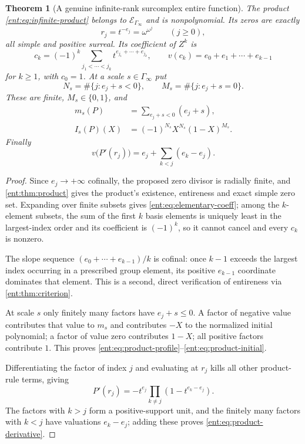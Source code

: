 \documentclass[11pt]{article}
\newtheorem{theorem}{Theorem}[section]
\theoremstyle{plain}
\theoremstyle{plain}
\theoremstyle{plain}
\theoremstyle{definition}
\theoremstyle{definition}
\theoremstyle{definition}
\theoremstyle{definition}
\theoremstyle{remark}
\begin{document}
\begin{theorem}[A genuine infinite-rank surcomplex entire function]
\label{ent:thm:infinite-example}
The product \eqref{ent:eq:infinite-product} belongs to
$\mathcal E_{\Gamma_\infty}$ and is nonpolynomial. Its zeros are exactly
\begin{equation}\label{ent:eq:surreal-zeros}
 r_j=t^{-e_j}=\omega^{\omega^j}\qquad(j\ge0),
\end{equation}
all simple and positive surreal. Its coefficient of $Z^k$ is
\begin{equation}\label{ent:eq:elementary-coeff}
 c_k=(-1)^k\sum_{j_1<\cdots<j_k}t^{e_{j_1}+\cdots+e_{j_k}},
 \qquad
 v(c_k)=e_0+e_1+\cdots+e_{k-1}
\end{equation}
for $k\ge1$, with $c_0=1$. At a scale $s\in\Gamma_\infty$ put
\[
 N_s=\#\{j:e_j+s<0\},\qquad M_s=\#\{j:e_j+s=0\}.
\]
These are finite, $M_s\in\{0,1\}$, and
\begin{align}
 m_s(P)&=\sum_{e_j+s<0}(e_j+s),\label{ent:eq:product-profile}\\
 I_s(P)(X)&=(-1)^{N_s}X^{N_s}(1-X)^{M_s}.\label{ent:eq:product-initial}
\end{align}
Finally
\begin{equation}\label{ent:eq:product-derivative}
 v\bigl(P'(r_j)\bigr)=e_j+\sum_{k<j}(e_k-e_j).
\end{equation}
\end{theorem}
\begin{proof}
Since $e_j\to+\infty$ cofinally, the proposed zero divisor is radially
finite, and \cref{ent:thm:product} gives the product's existence, entireness
and exact simple zero set. Expanding over finite subsets gives
\eqref{ent:eq:elementary-coeff}; among the $k$-element subsets, the sum of
the first $k$ basis elements is uniquely least in the largest-index order and
its coefficient is $(-1)^k$, so it cannot cancel and every $c_k$ is nonzero.

The slope sequence $(e_0+\cdots+e_{k-1})/k$ is cofinal: once $k-1$ exceeds
the largest index occurring in a prescribed group element, its positive
$e_{k-1}$ coordinate dominates that element. This is a second, direct
verification of entireness via \cref{ent:thm:criterion}.

At scale $s$ only finitely many factors have $e_j+s\le0$. A factor of
negative value contributes that value to $m_s$ and contributes $-X$ to the
normalized initial polynomial; a factor of value zero contributes $1-X$; all
positive factors contribute $1$. This proves
\eqref{ent:eq:product-profile}--\eqref{ent:eq:product-initial}.

Differentiating the factor of index $j$ and evaluating at $r_j$ kills all
other product-rule terms, giving
\[
 P'(r_j)=-t^{e_j}\prod_{k\ne j}(1-t^{e_k-e_j}).
\]
The factors with $k>j$ form a positive-support unit, and the finitely many
factors with $k<j$ have valuations $e_k-e_j$; adding these proves
\eqref{ent:eq:product-derivative}.
\end{proof}
\end{document}
